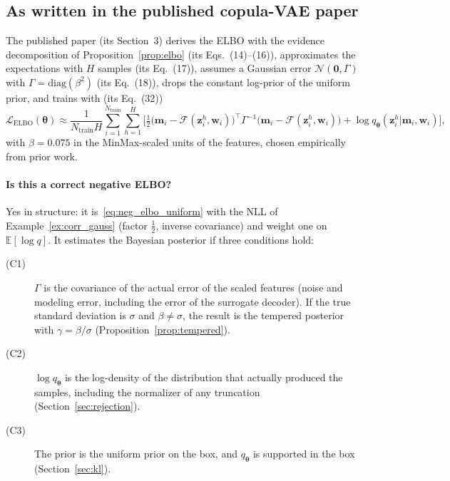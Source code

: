 \documentclass[11pt,a4paper]{article}
\numberwithin{equation}{section}
\theoremstyle{plain}
\theoremstyle{definition}
\theoremstyle{remark}
\newcommand{\m}{\mathbf{m}}
\newcommand{\z}{\mathbf{z}}
\newcommand{\thetab}{\bm{\theta}}
\newcommand{\E}{\mathbb{E}}
\newcommand{\ELBO}{\mathrm{ELBO}}
\newcommand{\Lc}{\mathcal{L}}
\newcommand{\N}{\mathcal{N}}
\newcommand{\Ntr}{N_{\text{train}}}
\newcommand{\qth}{q_{\bm{\theta}}}
\begin{document}
\subsection{As written in the published copula-VAE paper}
The published paper \cite{fernandez2026pem} (its Section~3) derives the ELBO with the evidence decomposition of Proposition~\ref{prop:elbo} (its Eqs.~(14)--(16)), approximates the expectations with $H$ samples (its Eq.~(17)), assumes a Gaussian error $\N(\mathbf0,\Gamma)$ with $\Gamma=\mathrm{diag}(\beta^2)$ (its Eq.~(18)), drops the constant log-prior of the uniform prior, and trains with (its Eq.~(32))
\begin{equation}
\Lc_{\ELBO}(\thetab)\approx\frac{1}{\Ntr H}\sum_{i=1}^{\Ntr}\sum_{h=1}^{H}\Big[\tfrac12\big(\m_i-\mathcal F(\z_i^h,\mathbf w_i)\big)^\top\Gamma^{-1}\big(\m_i-\mathcal F(\z_i^h,\mathbf w_i)\big)+\log\qth(\z_i^h|\m_i,\mathbf w_i)\Big],
\label{eq:pem_loss}
\end{equation}
with $\beta=0.075$ in the MinMax-scaled units of the features, chosen empirically from prior work.

\paragraph{Is this a correct negative ELBO?} Yes in structure: it is~\eqref{eq:neg_elbo_uniform} with the NLL of Example~\ref{ex:corr_gauss} (factor $\tfrac12$, inverse covariance) and weight one on $\E[\log q]$. It estimates the Bayesian posterior if three conditions hold:
\begin{description}
\item[(C1)] $\Gamma$ is the covariance of the actual error of the scaled features (noise and modeling error, including the error of the surrogate decoder). If the true standard deviation is $\sigma$ and $\beta\neq\sigma$, the result is the tempered posterior with $\gamma=\beta/\sigma$ (Proposition~\ref{prop:tempered}).
\item[(C2)] $\log\qth$ is the log-density of the distribution that actually produced the samples, including the normalizer of any truncation (Section~\ref{sec:rejection}).
\item[(C3)] The prior is the uniform prior on the box, and $\qth$ is supported in the box (Section~\ref{sec:kl}).
\end{description}
\end{document}
